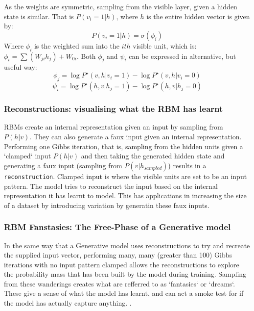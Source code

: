     As the weights are symmetric, sampling from the visible layer, given a hidden state is similar. That is $P(v_i = 1 | h)$, where $h$ is the entire hidden vector is given by:
    \begin{equation}\label{eq:Vis-Gibbs-Update}
     P(v_i = 1 | h) = \sigma(\phi_{i})
    \end{equation}
    Where $\phi_i$ is the weighted sum into the $ith$ visible unit, which is: $ \phi_i = \sum(W_{ji}h_{j}) + W_{0i} $. Both $\phi_j$ and $\psi_i$ can be expressed in alternative, but useful way:
    \begin{equation}
    \phi_j = \log P^\star(v,h | v_i = 1) - \log P^\star(v,h | v_i = 0)
    \end{equation}
    \begin{equation}\label{psi-gibbs-update-rbm}
    \psi_i = \log P^\star(h,v | h_j = 1) - \log P^\star(h,v | h_j = 0)
    \end{equation}



\subsubsection{Reconstructions: visualising what the RBM has learnt}\label{SS:RBM-Reconstructions}

RBMs create an internal representation given an input by sampling from $P(h|v)$. They can also generate a faux input given an internal representation. Performing one Gibbs iteration, that is, sampling from the hidden units given a `clamped` input $ P(h|v) $ and then taking the generated hidden state and generating a faux input (sampling from $P(v|h_{sampled})$) results in a \texttt{reconstruction}. Clamped input is where the visible units are set to be an input pattern. The model tries to reconstruct the input based on the internal representation it has learnt to model. This has applications in increasing the size of a dataset by introducing variation by generatin these faux inputs\todocite{}.

\subsubsection{RBM Fanstasies: The Free-Phase of a Generative model}

In the same way that a Generative model uses reconstructions to try and recreate the supplied input vector, performing many, many (greater than 100) Gibbs iterations with no input pattern clamped allows the reconstructions to explore the probability mass that has been built by the model during training. Sampling from these wanderings creates what are refferred to as `fantasies` or `dreams`. These give a sense of what the model has learnt, and can act a smoke test for if the model has actually capture anything.
.

